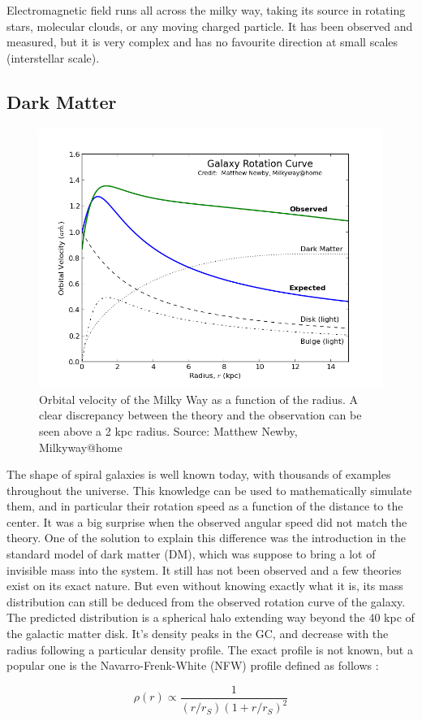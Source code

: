 Electromagnetic field runs all across the milky way, taking its source in rotating stars, molecular clouds, or any moving charged particle. It has been observed and measured, but it is very complex and has no favourite direction at small scales (interstellar scale).

\subsection{Dark Matter}

\begin{figure}[h]
 \centering
 \includegraphics[width=.5\linewidth]{pic/theory/gal_rotation_curve.png}
 \caption{Orbital velocity of the Milky Way as a function of the radius. A clear discrepancy between the theory and the observation can be seen above a 2 kpc radius. Source: Matthew Newby, Milkyway@home}
 \label{fig:gal_rotation_curve}
\end{figure}


The shape of spiral galaxies is well known today, with thousands of examples throughout the universe. This knowledge can be used to mathematically simulate them, and in particular their rotation speed as a function of the distance to the center. It was a big surprise when the observed angular speed did not match the theory. One of the solution to explain this difference was the introduction in the standard model of dark matter (DM), which was suppose to bring a lot of invisible mass into the system. It still has not been observed and a few theories exist on its exact nature. But even without knowing exactly what it is, its mass distribution can still be deduced from the observed rotation curve of the galaxy. The predicted distribution is a spherical halo extending way beyond the 40 kpc of the galactic matter disk. It's density peaks in the GC, and decrease with the radius following a particular density profile. The exact profile is not known, but a popular one is the Navarro-Frenk-White (NFW) profile defined as follows :

\begin{equation}
\rho (r) \propto \frac{1}{\left( r/r_S \right) \left( 1 + r/r_S \right)^2 }
\end{equation}

